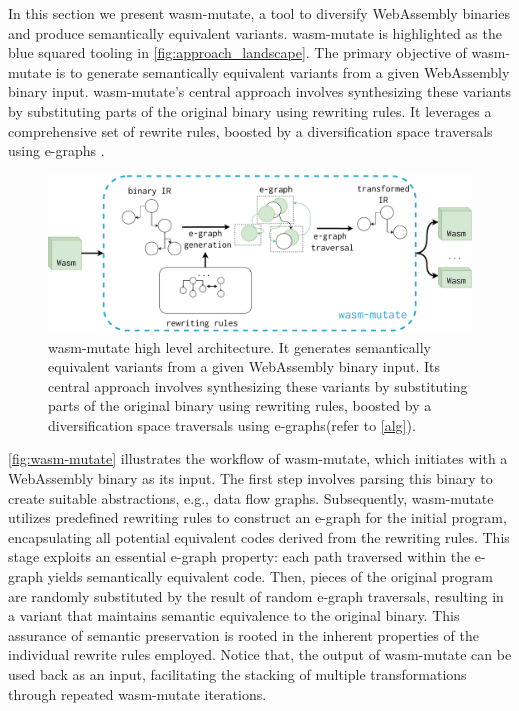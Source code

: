 \renewcommand{\tool}{wasm-mutate\xspace}

In this section we present \tool, a tool to diversify
WebAssembly binaries and produce semantically equivalent variants.
\tool is highlighted as the blue squared tooling in \autoref{fig:approach_landscape}.
The primary objective of \tool is to generate semantically equivalent variants from a given WebAssembly binary input. 
\tool's central approach involves synthesizing these variants by substituting parts of the original binary using rewriting rules. 
It leverages a comprehensive set of rewrite rules, boosted by a diversification space traversals using e-graphs \cite{egraph}.

\begin{figure}[h!]
    \centering
    \includegraphics[width=0.9\linewidth]{diagrams/wasm_mutate.workflow.pdf}
    \caption{ \tool high level architecture.  It generates semantically equivalent variants from a given WebAssembly binary input. 
    Its central approach involves synthesizing these variants by substituting parts of the original binary using rewriting rules, boosted by a diversification space traversals using e-graphs(refer to \autoref{alg}).}
  \label{fig:wasm-mutate}
\end{figure}


\autoref{fig:wasm-mutate} illustrates the workflow of \tool, which initiates with a WebAssembly binary as its input. 
The first step involves parsing this binary to create suitable abstractions, e.g., data flow graphs.
Subsequently, \tool utilizes predefined rewriting rules to construct an e-graph for the initial program, encapsulating all potential equivalent codes derived from the rewriting rules. 
This stage exploits an essential e-graph property: each path traversed within the e-graph yields semantically equivalent code.
Then, pieces of the original program are randomly substituted by the result of random e-graph traversals, resulting in a variant that maintains semantic equivalence to the original binary. 
This assurance of semantic preservation is rooted in the inherent properties of the individual rewrite rules employed.
Notice that, the output of \tool can be used back as an input, facilitating the stacking of multiple transformations through repeated \tool iterations.



